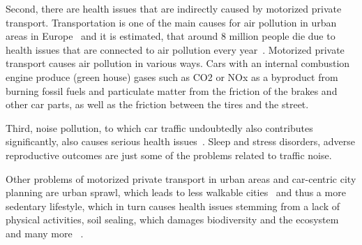 Second, there are health issues that are indirectly caused by motorized private transport.
Transportation is one of the main causes for air pollution in urban areas in Europe~\cite{european2019european} and it is estimated, that around 8 million people die due to health issues that are connected to air pollution every year~\cite{forouzanfar2016global}. 
Motorized private transport causes air pollution in various ways.
Cars with an internal combustion engine produce (green house) gases such as CO2 or NOx as a byproduct from burning fossil fuels and particulate matter from the friction of the brakes and other car parts, as well as the friction between the tires and the street.

Third, noise pollution, to which car traffic undoubtedly also contributes significantly, also causes serious health issues~\cite{khreis2016health}.
Sleep and stress disorders, adverse reproductive outcomes are just some of the problems related to traffic noise.

Other problems of motorized private transport in urban areas and car-centric city planning are urban sprawl, which leads to less walkable cities~\cite{patacchini2009urban} and thus a more sedentary lifestyle, which in turn causes health issues stemming from a lack of physical activities, soil sealing, which damages biodiversity and the ecosystem~\cite{tobias2018soil} and many more ~\cite{bozovic2021non,pritchard2022maas,mayers2020whose}.  


